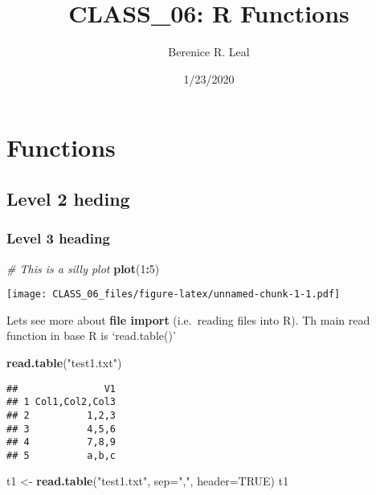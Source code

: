 \documentclass[
]{article}
\title{CLASS\_06: R Functions}
\author{Berenice R. Leal}
\date{1/23/2020}
\newenvironment{Shaded}{\begin{snugshade}}{\end{snugshade}}
\newcommand{\CommentTok}[1]{\textcolor[rgb]{0.56,0.35,0.01}{\textit{#1}}}
\newcommand{\DataTypeTok}[1]{\textcolor[rgb]{0.13,0.29,0.53}{#1}}
\newcommand{\DecValTok}[1]{\textcolor[rgb]{0.00,0.00,0.81}{#1}}
\newcommand{\KeywordTok}[1]{\textcolor[rgb]{0.13,0.29,0.53}{\textbf{#1}}}
\newcommand{\NormalTok}[1]{#1}
\newcommand{\OperatorTok}[1]{\textcolor[rgb]{0.81,0.36,0.00}{\textbf{#1}}}
\newcommand{\OtherTok}[1]{\textcolor[rgb]{0.56,0.35,0.01}{#1}}
\newcommand{\StringTok}[1]{\textcolor[rgb]{0.31,0.60,0.02}{#1}}
\begin{document}
\maketitle

\hypertarget{functions}{%
\section{Functions}\label{functions}}

\hypertarget{level-2-heding}{%
\subsection{Level 2 heding}\label{level-2-heding}}

\hypertarget{level-3-heading}{%
\subsubsection{Level 3 heading}\label{level-3-heading}}

\begin{Shaded}
\begin{Highlighting}[]
\CommentTok{# This is a silly plot}
\KeywordTok{plot}\NormalTok{(}\DecValTok{1}\OperatorTok{:}\DecValTok{5}\NormalTok{)}
\end{Highlighting}
\end{Shaded}

\texttt{[image: CLASS\_06\_files/figure-latex/unnamed-chunk-1-1.pdf]}

Lets see more about \textbf{file import} (i.e.~reading files into R). Th
main read function in base R is `read.table()'

\begin{Shaded}
\begin{Highlighting}[]
\KeywordTok{read.table}\NormalTok{(}\StringTok{"test1.txt"}\NormalTok{)}
\end{Highlighting}
\end{Shaded}

\begin{verbatim}
##               V1
## 1 Col1,Col2,Col3
## 2          1,2,3
## 3          4,5,6
## 4          7,8,9
## 5          a,b,c
\end{verbatim}

\begin{Shaded}
\begin{Highlighting}[]
\NormalTok{t1 <-}\StringTok{ }\KeywordTok{read.table}\NormalTok{(}\StringTok{"test1.txt"}\NormalTok{, }\DataTypeTok{sep=}\StringTok{","}\NormalTok{, }\DataTypeTok{header=}\OtherTok{TRUE}\NormalTok{)}
\NormalTok{t1}
\end{Highlighting}
\end{Shaded}
\end{document}
